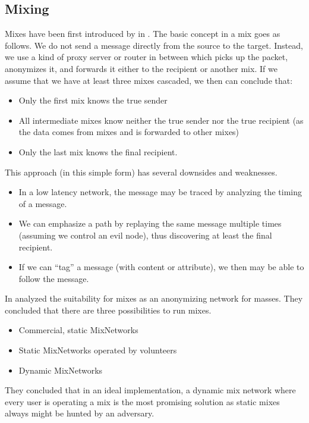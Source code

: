 \subsection{Mixing\label{sec:mixnets}}
Mixes have been first introduced by \cite{CHAUM1} in \citeyear{CHAUM1}. The basic concept in a mix goes as follows. We do not send a message directly from the source to the target. Instead, we use a kind of proxy server or router in between which picks up the packet, anonymizes it, and forwards it either to the recipient or another mix. If we assume that we have at least three mixes cascaded, we then can conclude that:
\begin{itemize}
	\item Only the first mix knows the true sender
	\item All intermediate mixes know neither the true sender nor the true recipient (as the data comes from mixes and is forwarded to other mixes) 
	\item Only the last mix knows the final recipient.
\end{itemize}

This approach (in this simple form) has several downsides and weaknesses.

\begin{itemize}
	\item In a low latency network, the message may be traced by analyzing the timing of a message.
	\item We can emphasize a path by replaying the same message multiple times (assuming we control an evil node), thus discovering at least the final recipient.
	\item If we can ``tag'' a message (with content or attribute), we then may be able to follow the message.
\end{itemize}

In \citeyear{RP03-1} \citeauthor{RP03-1} analyzed the suitability for mixes as an anonymizing network for masses. They concluded that there are three possibilities to run mixes.
\begin{itemize}
	\item Commercial, static MixNetworks
	\item Static MixNetworks operated by volunteers
	\item Dynamic MixNetworks
\end{itemize}
They concluded that in an ideal implementation, a dynamic mix network where every user is operating a mix is the most promising solution as static mixes always might be hunted by an adversary.

